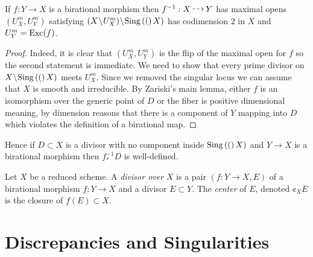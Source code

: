 \documentclass[12pt]{article}
\begin{document}
\begin{lemma}
If $f : Y \to X$ is a birational morphism then $f^{-1} : X \rat Y$ has maximal opens $(U_X^m, U_Y^m)$ satisfying $(X \! \setminus \! U_X^m) \! \setminus \! \mathrm{Sing}\left( ( \right)X)$ has codimension $2$ in $X$ and $U_Y^m = \operatorname{\mathrm{Exc}}(f)$.
\end{lemma}

\begin{proof}
Indeed, it is clear that $(U_X^m, U_Y^m)$ is the flip of the maximal open for $f$ so the second statement is immediate. We need to show that every prime divisor on $X \! \setminus \! \mathrm{Sing}\left( ( \right)X)$ meets $U_X^m$. Since we removed the singular locus we can assume that $X$ is smooth and irreducible. By Zariski's main lemma, either $f$ is an isomorphism over the generic point of $D$ or the fiber is positive dimensional meaning, by dimension reasons that there is a component of $Y$ mapping into $D$ which violates the definition of a birational map. 
\end{proof}

\begin{rmk}
Hence if $D \subset X$ is a divisor with no component inside $\mathrm{Sing}\left( ( \right)X)$ and $Y \to X$ is a birational morphism then $f^{-1}_* D$ is well-defined. 
\end{rmk}

\begin{defn}
Let $X$ be a reduced scheme. A \textit{divisor over} $X$ is a pair $(f : Y \to X, E)$ of a birational morphism $f : Y \to X$ and a divisor $E \subset Y$. The \textit{center} of $E$, denoted $\cent_X E$ is the closure of $f(E) \subset X$.   
\end{defn}

\section{Discrepancies and Singularities}
\end{document}
